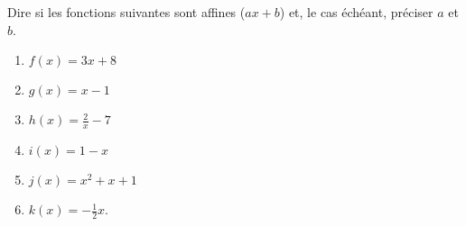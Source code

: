 
\begin{exercice}\label{exosmath-0149}

    Dire si les fonctions suivantes sont affines (\( ax+b\)) et, le cas échéant, préciser \( a\) et \( b\).
    \begin{multicols}{3}
        \begin{enumerate}
            \item
                \( f(x)=3x+8\)
            \item
                \( g(x)=x-1\)
            \item
                \( h(x)=\frac{ 2 }{ x }-7\)
            \item
                \( i(x)=1-x\)
            \item
                \( j(x)=x^2+x+1\)
            \item
                \( k(x)=-\frac{ 1 }{2}x\).
        \end{enumerate}
    \end{multicols}

\end{exercice}
